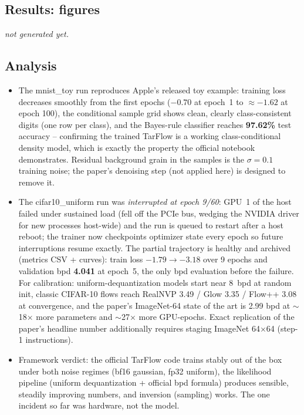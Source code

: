 \documentclass[11pt]{article}
\begin{document}
\subsection{Results: figures}
  {\emph{not generated yet.}}
\clearpage

\subsection{Analysis}
\begin{itemize}
  \item The mnist\_toy run reproduces Apple's released toy example: training
        loss decreases smoothly from the first epochs ($-0.70$ at epoch~1 to
        $\approx-1.62$ at epoch 100), the conditional sample grid shows clean,
        clearly class-consistent digits (one row per class), and the
        Bayes-rule classifier reaches \textbf{97.62\%} test accuracy --
        confirming the trained TarFlow is a working class-conditional density
        model, which is exactly the property the official notebook
        demonstrates. Residual background grain in the samples is the
        $\sigma=0.1$ training noise; the paper's denoising step (not applied
        here) is designed to remove it.
  \item The cifar10\_uniform run was \emph{interrupted at epoch 9/60}: GPU~1
        of the host failed under sustained load (fell off the PCIe bus,
        wedging the NVIDIA driver for new processes host-wide) and the run is
        queued to restart after a host reboot; the trainer now checkpoints
        optimizer state every epoch so future interruptions resume exactly. The
        partial trajectory is healthy and archived (metrics CSV + curves):
        train loss $-1.79 \to -3.18$ over 9 epochs and validation bpd
        \textbf{4.041} at epoch~5, the only bpd evaluation before the
        failure. For calibration: uniform-dequantization models start near
        8~bpd at random init, classic CIFAR-10 flows reach RealNVP 3.49 /
        Glow 3.35 / Flow++ 3.08 at convergence, and the paper's ImageNet-64
        state of the art is 2.99 bpd at $\sim$18$\times$ more parameters and
        $\sim$27$\times$ more GPU-epochs. Exact replication of the paper's
        headline number additionally requires staging ImageNet 64$\times$64
        (step-1 instructions).
  \item Framework verdict: the official TarFlow code trains stably out of
        the box under both noise regimes (bf16 gaussian, fp32 uniform), the
        likelihood pipeline (uniform dequantization + official bpd formula)
        produces sensible, steadily improving numbers, and inversion
        (sampling) works. The one incident so far was hardware, not the
        model.
\end{itemize}
\end{document}
